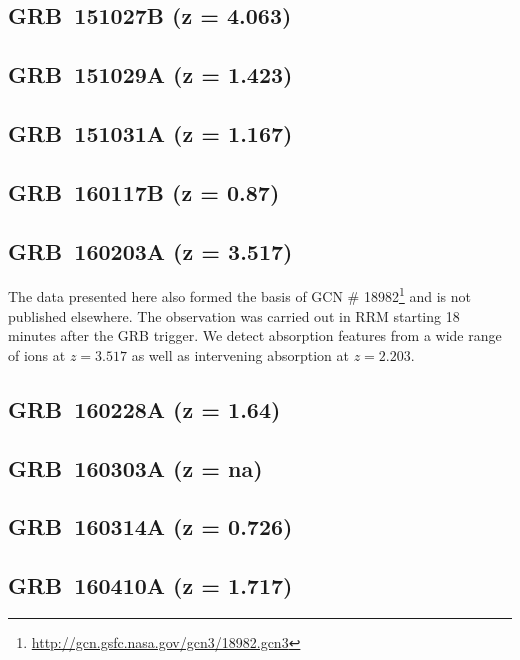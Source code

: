 \documentclass{aa}    %
\begin{document}
\subsection{GRB~151027B (z = 4.063)}	



\subsection{GRB~151029A (z = 1.423)}	



\subsection{GRB~151031A (z = 1.167)}	



\subsection{GRB~160117B (z = 0.87)}	



\subsection{GRB~160203A (z = 3.517)}

The data presented here also formed the basis of GCN \#
18982\footnote{\url{http://gcn.gsfc.nasa.gov/gcn3/18982.gcn3}} and is not
published elsewhere. The observation was carried out in RRM starting 18 minutes
after the GRB trigger. We detect absorption features from a wide range of ions
at $z=3.517$ as well as intervening absorption at $z=2.203$.

\subsection{GRB~160228A (z = 1.64)}	



\subsection{GRB~160303A (z = na)}	



\subsection{GRB~160314A (z = 0.726)}	



\subsection{GRB~160410A (z = 1.717)}	
\end{document}
